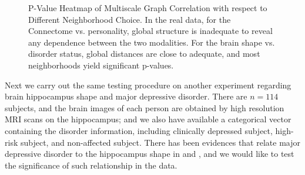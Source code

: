 \documentclass[11pt]{article}
\begin{document}
\begin{figure}[htbp]
\centering
{}
\hfil
\centering
{}
\hfil
\centering
{}
\caption{P-Value Heatmap of Multiscale Graph Correlation with respect to Different Neighborhood Choice.  In the real data, for the Connectome vs. personality, global structure is inadequate to reveal any dependence between the two modalities.  For the brain shape vs. disorder status,  global distances are close to adequate, and most neighborhoods yield significant p-values.}
\label{figReal}
\end{figure}

Next we carry out the same testing procedure on another experiment regarding brain hippocampus shape and major depressive disorder. There are $n=114$ subjects, and the brain images of each person are obtained by high resolution MRI scans on the hippocampus; and we also have available a categorical vector containing the disorder information, including clinically depressed subject, high-risk subject, and non-affected subject. There has been evidences that relate major depressive disorder to the hippocampus shape in \cite{ParkEtAl2011} and \cite{PosenerEtAl2003}, and we would like to test the significance of such relationship in the data. 
\end{document}
